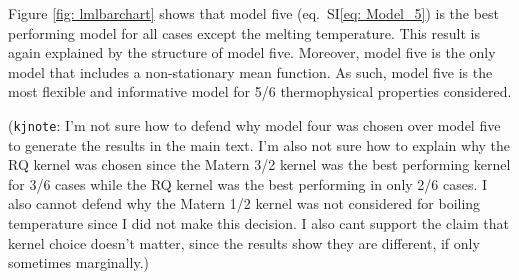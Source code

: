 \documentclass[journal=jacsat,manuscript=article]{achemso}
\newcommand{\kjnote}[1]{{\color{Blue} (\texttt{kjnote}: #1)}}
\newcommand{\siref}[1]{SI\eqref{#1}}
\begin{document}
Figure \ref{fig: lmlbarchart} shows that model five (eq.~\siref{eq: Model_5}) is the best performing model for all cases except the melting temperature. This result is again explained by the structure of model five. Moreover, model five is the only model that includes a non-stationary mean function. As such, model five is the most flexible and informative model for 5/6 thermophysical properties considered.

\kjnote{I'm not sure how to defend why model four was chosen over model five to generate the results in the main text. I'm also not sure how to explain why the RQ kernel was chosen since the Matern 3/2 kernel was the best performing kernel for 3/6 cases while the RQ kernel was the best performing in only 2/6 cases. I also cannot defend why the Matern 1/2 kernel was not considered for boiling temperature since I did not make this decision. I also cant support the claim that kernel choice doesn't matter, since the results show they are different, if only sometimes marginally.}
\end{document}
